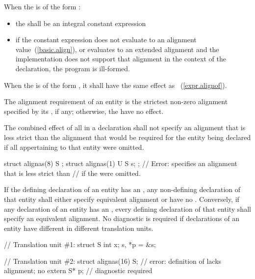 \pnum
When the  is of the form
  \tcode{)}:

\begin{itemize}
\item the  shall be an integral constant expression

\item if the constant expression does not evaluate to an alignment
value~(\ref{basic.align}), or evaluates to an extended alignment and
the implementation does not support that alignment in the context of the
declaration, the program is ill-formed.
\end{itemize}

\pnum
When the  is of the form
  \tcode{)}, it shall have the same
effect as \tcode{))}~(\ref{expr.alignof}).

\pnum
The alignment requirement of an entity is the strictest non-zero alignment
specified by its , if any;
otherwise, the  have no effect.

\pnum
The combined effect of all  in a declaration shall not
specify an alignment that is less strict than the alignment that would
be required for the entity being declared if all 
appertaining to that entity
were omitted.
\enterexample
\begin{codeblock}
struct alignas(8) S {};
struct alignas(1) U {
  S s;
};   // Error:  specifies an alignment that is less strict than
     // if the  were omitted.
\end{codeblock}
\exitexample

\pnum
If the defining declaration of an entity has an
, any non-defining
declaration of that entity shall either specify equivalent alignment or have no
.
Conversely, if any declaration of an entity has an
,
every defining
declaration of that entity shall specify an equivalent alignment.
No diagnostic is required if declarations of an entity have
different 
in different translation units.

\enterexample
\begin{codeblock}
// Translation unit \#1:
struct S { int x; } s, *p = &s;

// Translation unit \#2:
struct alignas(16) S;           // error: definition of  lacks alignment; no
extern S* p;                    // diagnostic required
\end{codeblock}
\exitexample

